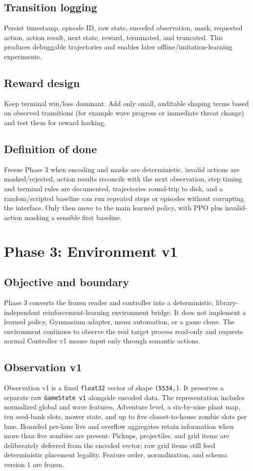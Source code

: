 \documentclass[11pt,a4paper]{article}
\begin{document}
\subsection{Transition logging}
Persist timestamp, episode ID, raw state, encoded observation, mask, requested action, action result, next state, reward, terminated, and truncated. This produces debuggable trajectories and enables later offline/imitation-learning experiments.
\subsection{Reward design}
Keep terminal win/loss dominant. Add only small, auditable shaping terms based on observed transitions (for example wave progress or immediate threat change) and test them for reward hacking.
\subsection{Definition of done}
Freeze Phase 3 when encoding and masks are deterministic, invalid actions are masked/rejected, action results reconcile with the next observation, step timing and terminal rules are documented, trajectories round-trip to disk, and a random/scripted baseline can run repeated steps or episodes without corrupting the interface. Only then move to the main learned policy, with PPO plus invalid-action masking a sensible first baseline.
\section{Phase 3: Environment v1}
\subsection{Objective and boundary}
Phase 3 converts the frozen reader and controller into a deterministic, library-independent reinforcement-learning environment bridge. It does not implement a learned policy, Gymnasium adapter, menu automation, or a game clone. The environment continues to observe the real target process read-only and requests normal Controller v1 mouse input only through semantic actions.

\subsection{Observation v1}
Observation v1 is a fixed \texttt{float32} vector of shape \texttt{(5534,)}. It preserves a separate raw \texttt{GameState v1} alongside encoded data. The representation includes normalized global and wave features, Adventure level, a six-by-nine plant map, ten seed-bank slots, mower state, and up to five closest-to-house zombie slots per lane. Bounded per-lane live and overflow aggregates retain information when more than five zombies are present. Pickups, projectiles, and grid items are deliberately deferred from the encoded vector; raw grid items still feed deterministic placement legality. Feature order, normalization, and schema version 1 are frozen.
\end{document}
